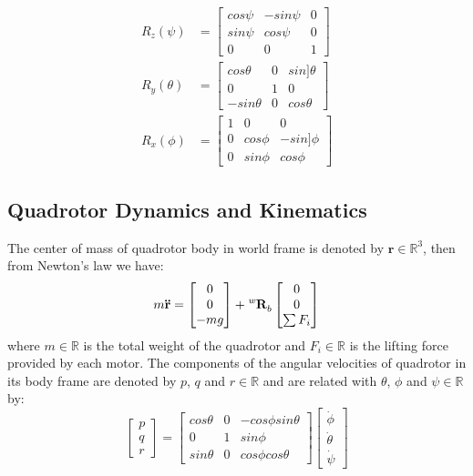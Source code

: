 \begin{equation}\label{eq:rotation}
\begin{aligned}
R_z(\psi)&=\begin{bmatrix}cos\psi&-sin\psi&0\\sin\psi&cos\psi&0\\0&0&1\end{bmatrix}\\
R_y(\theta)&=\begin{bmatrix}cos\theta&0&sin]\theta\\0&1&0\\-sin\theta&0&cos\theta\end{bmatrix}\\
R_x(\phi)&=\begin{bmatrix}1&0&0\\0&cos\phi&-sin]\phi\\0&sin\phi&cos\phi\end{bmatrix}
\end{aligned}
\end{equation}

\subsection{Quadrotor Dynamics and Kinematics}

The center of mass of quadrotor body in world frame is denoted by $\mathbf{r}\in\mathbb{R}^3$, then from Newton's law we have:
\begin{equation}\label{eq:newton}
m\mathbf{\ddot{r}}=\begin{bmatrix}0\\0\\-mg\end{bmatrix}+\tensor*[^w]{\mathbf{R}}{_b}\begin{bmatrix}0\\0\\\sum F_i\end{bmatrix}
\end{equation}
where $\mathit{m}\in\mathbb{R}$ is the total weight of the quadrotor and $\mathit{F_i}\in\mathbb{R}$ is the lifting force provided by each motor. The components of the angular velocities of quadrotor in its body frame are denoted by $\mathit{p}$, $\mathit{q}$ and $\mathit{r}\in\mathbb{R}$ and are related with $\theta$, $\phi$ and $\psi\in\mathbb{R}$ by:
\begin{equation}\label{eq:pqr}
\begin{bmatrix}p\\q\\r\end{bmatrix}=\begin{bmatrix}cos\theta&0&-cos\phi sin\theta\\0&1&sin\phi\\sin\theta&0&cos\phi cos\theta\end{bmatrix}\begin{bmatrix}\dot{\phi}\\\dot{\theta}\\\dot{\psi}\end{bmatrix}
\end{equation}

